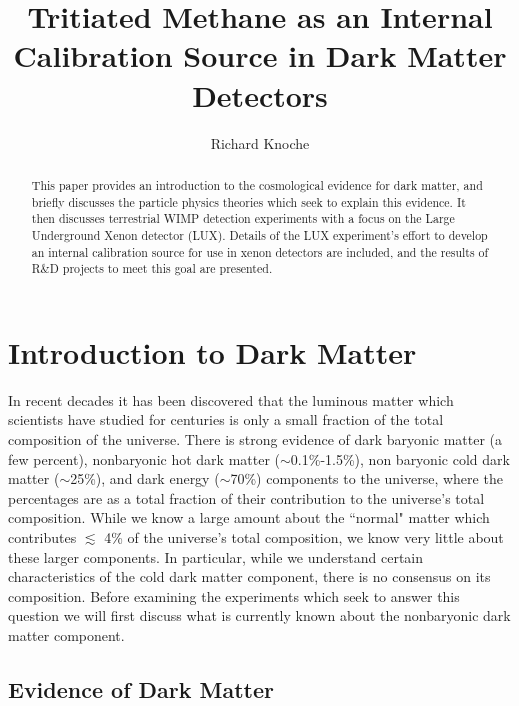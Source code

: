 \documentclass[a4paper,12pt]{article}
\begin{document}
\title{Tritiated Methane as an Internal Calibration Source in Dark Matter Detectors}
\author{Richard Knoche}
\maketitle

\begin{abstract}
This paper provides an introduction to the cosmological evidence for dark matter, and briefly discusses the particle physics theories which seek to explain this evidence.  It then discusses terrestrial WIMP detection experiments with a focus on the Large Underground Xenon detector (LUX).  Details of the LUX experiment's effort to develop an internal calibration source for use in xenon detectors are included, and the results of R\&D projects to meet this goal are presented.
\end{abstract}

\tableofcontents



\section{Introduction to Dark Matter}

In recent decades it has been discovered that the luminous matter which scientists have studied for centuries is only a small fraction of the total composition of the universe.  There is strong evidence of dark baryonic matter (a few percent), nonbaryonic hot dark matter ($\sim$0.1\%-1.5\%), non baryonic cold dark matter ($\sim$25\%), and dark energy ($\sim$70\%) components to the universe, where the percentages are as a total fraction of their contribution to the universe's total composition.  While we know a large amount about the ``normal" matter which contributes $ \lesssim $ 4\% of the universe's total composition, we know very little about these larger components.  In particular, while we understand certain characteristics of the cold dark matter component, there is no consensus on its composition.  Before examining the experiments which seek to answer this question we will first discuss what is currently known about the nonbaryonic dark matter component.

\subsection{Evidence of Dark Matter}
\end{document}
